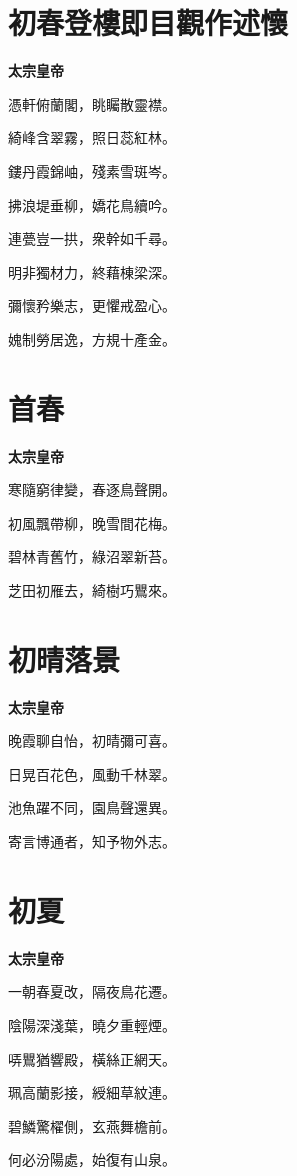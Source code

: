 \documentclass[12pt,a4paper]{ctexbook}
\begin{document}
\section{初春登樓即目觀作述懷}
\textbf{太宗皇帝}\par\vspace{0.5em}
憑軒俯蘭閣，眺矚散靈襟。\par
綺峰含翠霧，照日蕊紅林。\par
鏤丹霞錦岫，殘素雪斑岑。\par
拂浪堤垂柳，嬌花鳥續吟。\par
連甍豈一拱，衆幹如千尋。\par
明非獨材力，終藉棟梁深。\par
彌懷矜樂志，更懼戒盈心。\par
媿制勞居逸，方規十產金。\par

\section{首春}
\textbf{太宗皇帝}\par\vspace{0.5em}
寒隨窮律變，春逐鳥聲開。\par
初風飄帶柳，晚雪間花梅。\par
碧林青舊竹，綠沼翠新苔。\par
芝田初雁去，綺樹巧鸎來。\par

\section{初晴落景}
\textbf{太宗皇帝}\par\vspace{0.5em}
晚霞聊自怡，初晴彌可喜。\par
日晃百花色，風動千林翠。\par
池魚躍不同，園鳥聲還異。\par
寄言博通者，知予物外志。\par

\section{初夏}
\textbf{太宗皇帝}\par\vspace{0.5em}
一朝春夏改，隔夜鳥花遷。\par
陰陽深淺葉，曉夕重輕煙。\par
哢鸎猶響殿，橫絲正網天。\par
珮高蘭影接，綬細草紋連。\par
碧鱗驚櫂側，玄燕舞檐前。\par
何必汾陽處，始復有山泉。\par
\end{document}
